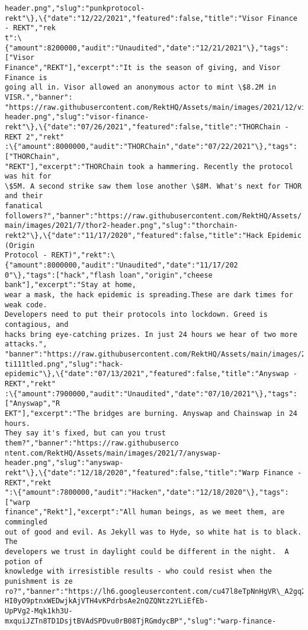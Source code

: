 \documentclass[11pt]{article}
\begin{document}
\begin{Verbatim}[commandchars=\\\{\}]
header.png","slug":"punkprotocol-
rekt"\},\{"date":"12/22/2021","featured":false,"title":"Visor Finance - REKT","rek
t":\{"amount":8200000,"audit":"Unaudited","date":"12/21/2021"\},"tags":["Visor
Finance","REKT"],"excerpt":"It is the season of giving, and Visor Finance is
going all in. Visor allowed an anonymous actor to mint \$8.2M in VISR.","banner":
"https://raw.githubusercontent.com/RektHQ/Assets/main/images/2021/12/visor-
header.png","slug":"visor-finance-
rekt"\},\{"date":"07/26/2021","featured":false,"title":"THORChain - REKT 2","rekt"
:\{"amount":8000000,"audit":"THORChain","date":"07/22/2021"\},"tags":["THORChain",
"REKT"],"excerpt":"THORChain took a hammering. Recently the protocol was hit for
\$5M. A second strike saw them lose another \$8M. What's next for THOR and their
fanatical followers?","banner":"https://raw.githubusercontent.com/RektHQ/Assets/
main/images/2021/7/thor2-header.png","slug":"thorchain-
rekt2"\},\{"date":"11/17/2020","featured":false,"title":"Hack Epidemic (Origin
Protocol - REKT)","rekt":\{"amount":8000000,"audit":"Unaudited","date":"11/17/202
0"\},"tags":["hack","flash loan","origin","cheese bank"],"excerpt":"Stay at home,
wear a mask, the hack epidemic is spreading.These are dark times for weak code.
Developers need to put their protocols into lockdown. Greed is contagious, and
hacks bring eye-catching prizes. In just 24 hours we hear of two more attacks.",
"banner":"https://raw.githubusercontent.com/RektHQ/Assets/main/images/2020/11/Un
ti111tled.png","slug":"hack-
epidemic"\},\{"date":"07/13/2021","featured":false,"title":"Anyswap - REKT","rekt"
:\{"amount":7900000,"audit":"Unaudited","date":"07/10/2021"\},"tags":["Anyswap","R
EKT"],"excerpt":"The bridges are burning. Anyswap and Chainswap in 24 hours.
They say it's fixed, but can you trust them?","banner":"https://raw.githubuserco
ntent.com/RektHQ/Assets/main/images/2021/7/anyswap-header.png","slug":"anyswap-
rekt"\},\{"date":"12/18/2020","featured":false,"title":"Warp Finance - REKT","rekt
":\{"amount":7800000,"audit":"Hacken","date":"12/18/2020"\},"tags":["warp
finance","Rekt"],"excerpt":"All human beings, as we meet them, are commingled
out of good and evil. As Jekyll was to Hyde, so white hat is to black. The
developers we trust in daylight could be different in the night.  A potion of
knowledge with irresistible results - who could resist when the punishment is ze
ro?","banner":"https://lh6.googleusercontent.com/cu47l8eTpNnHgVR\_A2gq2boptXZBIIF
HI0yO9ptnxWEDwjkAjVTH4vKPdrbsAe2nQZQNtz2YLiEfEb-
UpPVg2-Mqk1kh3U-mxquiJZTn8TD1DsjtBVAdSPDvu0rB08TjRGmdycBP","slug":"warp-finance-

\end{Verbatim}
\end{document}

